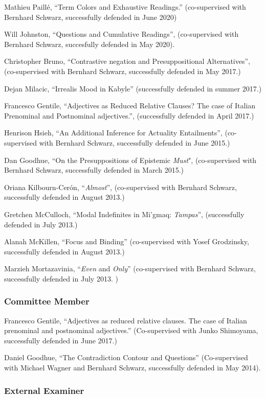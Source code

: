 \documentclass[11pt]{article}
\begin{document}
Mathieu Paill\'e, ``Term Colors and Exhaustive Readings.'' (co-supervised with Bernhard Schwarz, successfully defended in June 2020)

Will Johnston, ``Questions and Cumulative Readings'', (co-supervised with Bernhard Schwarz, succesfully defended in May 2020).

Christopher Bruno, ``Contrastive negation and Presuppositional Alternatives'', (co-supervised with Bernhard Schwarz, successfully defended in May 2017.)

Dejan Milacic, ``Irrealis Mood in Kabyle'' (successfully defended in summer 2017.)

Francesco Gentile, ``Adjectives as Reduced Relative Clauses?
The case of Italian Prenominal and Postnominal adjectives.'', (successfully defended in April  2017.)

Henrison Hsieh, ``An Additional Inference for Actuality Entailments'',
(co-supervised with Bernhard Schwarz, successfully defended in June 2015.)

Dan Goodhue, ``On the Presuppositions of Epistemic \textit{Must}", (co-supervised with Bernhard Schwarz, successfully defended in March 2015.)


Oriana Kilbourn-Cer\'on, ``\textit{Almost}'', (co-supervised with Bernhard Schwarz,
successfully defended in August 2013.) 

Gretchen McCulloch, ``Modal Indefinites in Mi'gmaq: \textit{Tampas}'', (successfully defended in July 2013.)

Alanah McKillen, ``Focus and Binding'' (co-supervised with Yosef
Grodzinsky, successfully defended in August 2013.)

Marzieh Mortazavinia, ``\textit{Even} and \textit{Only}''
(co-supervised with Bernhard Schwarz, successfully defended in July
2013. )


\subsubsection*{Committee Member}


Francesco Gentile,  ``Adjectives as reduced relative clauses. The case of Italian prenominal and postnominal adjectives.'' (Co-supervised with Junko Shimoyama, successfully defended in June 2017.)

Daniel Goodhue, ``The Contradiction Contour and Questions''
(Co-supervised with Michael Wagner and Bernhard Schwarz, successfully
defended in May 2014).

\subsubsection*{External Examiner}
\end{document}
